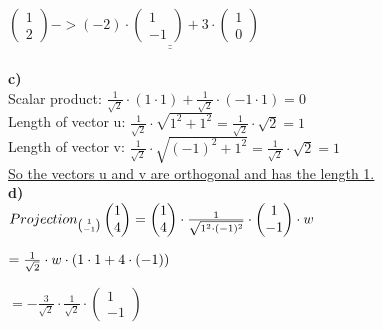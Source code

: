 \documentclass[11pt]{amsart}
\begin{document}
$\begin{pmatrix} 1 \\ 2 \end{pmatrix} -> 
 \underline{\underline{(-2) \cdot \begin{pmatrix} 1 \\ -1 \end{pmatrix} + 3 \cdot \begin{pmatrix} 1 \\ 0 \end{pmatrix}}}$ \\\\
 
\textbf{c)}\\
 
Scalar product: $\frac{1}{\sqrt{2}}\cdot(1\cdot1) + \frac{1}{\sqrt{2}}\cdot(-1\cdot1) = 0 $\\ 
 
Length of vector u: $\frac{1}{\sqrt{2}} \cdot \sqrt{1^2+1^2} = \frac{1}{\sqrt{2}}\cdot\sqrt{2} = 1$ \\
 
 
Length of vector v: $\frac{1}{\sqrt{2}} \cdot \sqrt{(-1)^2+1^2} = \frac{1}{\sqrt{2}}\cdot\sqrt{2} = 1$ \\
 
\underline{\underline{So the vectors u and v are orthogonal and has the length 1.}} \\
 
 
 
 \textbf{d)}\\

$Projection_{\binom{1}{-1}} \begin{pmatrix} 1 \\ 4 \end{pmatrix} = \begin{pmatrix} 1 \\ 4 \end{pmatrix} \cdot \frac{1}{\sqrt{1^2\cdot(-1)^2}} \cdot \begin{pmatrix} 1 \\ -1 \end{pmatrix} 
 \cdot w \\\\$  
 
$  = \frac{1}{\sqrt{2}} \cdot w \cdot (1\cdot1+4\cdot(-1)) \\\\$ 

$= -\frac{3}{\sqrt{2}} \cdot \frac{1}{\sqrt{2}} \cdot \begin{pmatrix} 1 \\ -1 \end{pmatrix} $ \\\\
\end{document}
